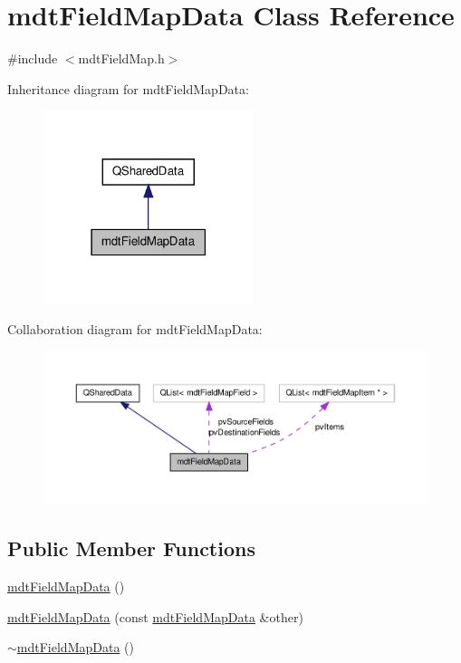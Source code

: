 \hypertarget{classmdt_field_map_data}{\section{mdt\-Field\-Map\-Data Class Reference}
\label{classmdt_field_map_data}
}


{\ttfamily \#include $<$mdt\-Field\-Map.\-h$>$}



Inheritance diagram for mdt\-Field\-Map\-Data\-:
\nopagebreak
\begin{figure}[H]
\begin{center}
\leavevmode
\includegraphics[width=174pt]{classmdt_field_map_data__inherit__graph}
\end{center}
\end{figure}


Collaboration diagram for mdt\-Field\-Map\-Data\-:
\nopagebreak
\begin{figure}[H]
\begin{center}
\leavevmode
\includegraphics[width=350pt]{classmdt_field_map_data__coll__graph}
\end{center}
\end{figure}
\subsection*{Public Member Functions}
\begin{DoxyCompactItemize}
\item 
\hyperlink{classmdt_field_map_data_a415a1944bb29d3924bc2c6cdfc16d6e9}{mdt\-Field\-Map\-Data} ()
\item 
\hyperlink{classmdt_field_map_data_a6d0ffeb8ea676ef83975e9d5ebb1fed1}{mdt\-Field\-Map\-Data} (const \hyperlink{classmdt_field_map_data}{mdt\-Field\-Map\-Data} \&other)
\item 
\hyperlink{classmdt_field_map_data_a59e52f8613a8cdb5d6c1baa0d74109a7}{$\sim$mdt\-Field\-Map\-Data} ()
\end{DoxyCompactItemize}
